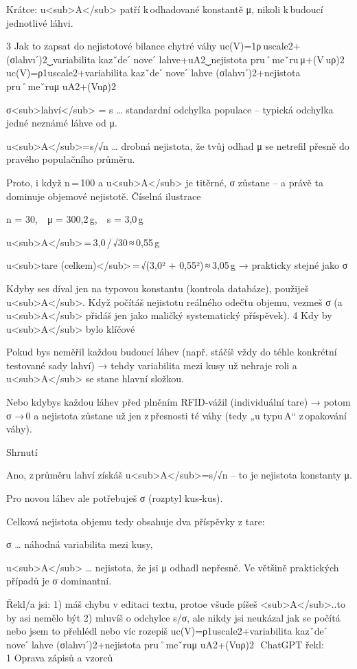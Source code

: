     Krátce:
    u<sub>A</sub> patří k odhadované konstantě μ, nikoli k budoucí jednotlivé láhvi.

3  Jak to zapsat do nejistotové bilance chytré váhy
uc(V)=1ρ uscale2+(σlahvıˊ)2⏟variabilita kazˇdeˊ noveˊ lahve+uA2⏟nejistota pru˚meˇru μ+(V uρ)2
uc​(V)=ρ1​uscale2​+variabilita kazˇdeˊ noveˊ lahve
(σlahvıˊ​)2​​+nejistota pru˚meˇruμ
uA2​​​+(Vuρ​)2
​

    σ<sub>lahví</sub> = s … standardní odchylka populace – typická odchylka jedné neznámé láhve od μ.

    u<sub>A</sub>=s/√n … drobná nejistota, že tvůj odhad μ se netrefil přesně do pravého populačního průměru.

Proto, i když n = 100 a u<sub>A</sub> je titěrné, σ zůstane – a právě ta dominuje objemové nejistotě.
Číselná ilustrace

    n = 30, μ = 300,2 g, s = 3,0 g

    u<sub>A</sub> = 3,0 / √30 ≈ 0,55 g

    u<sub>tare (celkem)</sub> = √(3,0² + 0,55²) ≈ 3,05 g → prakticky stejné jako σ

Kdyby ses díval jen na typovou konstantu (kontrola databáze), použiješ u<sub>A</sub>.
Když počítáš nejistotu reálného odečtu objemu, vezmeš σ (a u<sub>A</sub> přidáš jen jako maličký systematický příspěvek).
4  Kdy by u<sub>A</sub> bylo klíčové

    Pokud bys neměřil každou budoucí láhev (např. stáčíš vždy do téhle konkrétní testované sady lahví) → tehdy variabilita mezi kusy už nehraje roli a u<sub>A</sub> se stane hlavní složkou.

    Nebo kdybys každou láhev před plněním RFID‑vážil (individuální tare) → potom σ → 0 a nejistota zůstane už jen z přesnosti té váhy (tedy „u typu A“ z opakování váhy).

Shrnutí

    Ano, z průměru lahví získáš u<sub>A</sub>=s/√n – to je nejistota konstanty μ.

    Pro novou láhev ale potřebuješ σ (rozptyl kus‑kus).

    Celková nejistota objemu tedy obsahuje dva příspěvky z tare:

        σ … náhodná variabilita mezi kusy,

        u<sub>A</sub> … nejistota, že jsi μ odhadl nepřesně.
        Ve většině praktických případů je σ dominantní.

Řekl/a jsi:
1) máš chybu v editaci textu, protoe všude píšeš <sub>A</sub>..to by asi nemělo být
2) mluvíš o odchylce s/σ, ale nikdy jsi neukázal jak se počítá nebo jsem to přehlédl nebo víc rozepiš 
uc​(V)=ρ1​uscale2​+variabilita kazˇdeˊ noveˊ lahve
(σlahvıˊ​)2​​+nejistota pru˚meˇruμ
uA2​​​+(Vuρ​)2
​
ChatGPT řekl:
1  Oprava zápisů a vzorců

